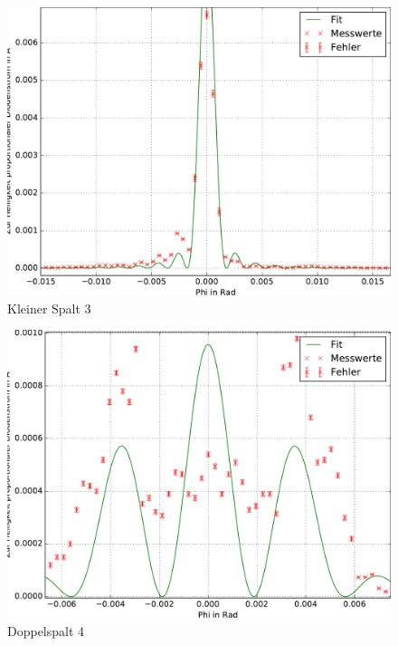       \begin{figure}[H]
          \centering
          \includegraphics[width=.9\textwidth]{../plots/single_slit3.pdf}
          \caption{Kleiner Spalt 3}
          \label{fig:sub3}
      \end{figure}%
      
      \begin{figure}[H]
          \centering
          \includegraphics[width=.9\textwidth]{../plots/double_slit.pdf}
          \caption{Doppelspalt 4}
          \label{fig:sub2}
      \end{figure}%



